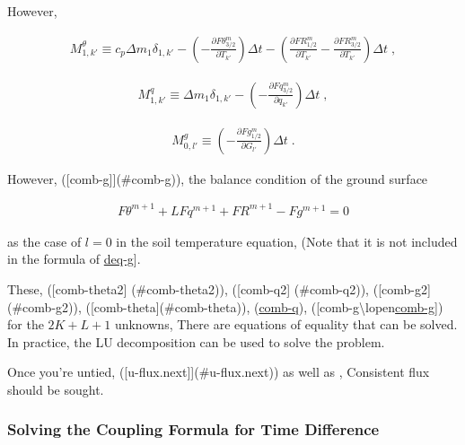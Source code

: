 \begin{quote}
\protect\hypertarget{combo-g}{}{\cleaner[combo-g]}
\end{quote}

However,

\begin{eqnarray}
M^{\theta}_{1,k'} \equiv c_p \Delta m_1 \delta_{1,k'}
          -  \left(
                   - \frac{\partial F\theta^{m}_{3/2}}{\partial T_{k'}} \right) \Delta t
          -  \left( \frac{\partial FR^{m}_{1/2}}{\partial T_{k'}} 
                   - \frac{\partial FR^{m}_{3/2}}{\partial T_{k'}} \right) \Delta t \; , 
\end{eqnarray}

\begin{eqnarray}
M^{q}_{1,k'} \equiv \Delta m_1 \delta_{1,k'}
          -  \left(
                   - \frac{\partial Fq^{m}_{3/2}}{\partial q_{k'}} \right) \Delta t \; ,
\end{eqnarray}

\begin{eqnarray}
M^{g}_{0,l'} \equiv
             \left(
                   - \frac{\partial Fg^{m}_{1/2}}{\partial G_{l'}} \right) \Delta t \; .
\end{eqnarray}

However, ({[}comb-g{]}{]}(\#comb-g)), the balance condition of the
ground surface

\begin{eqnarray}
   F\theta^{m+1} + L Fq^{m+1} + FR^{m+1} - Fg^{m+1} = 0
\end{eqnarray}

as the case of \(l=0\) in the soil temperature equation, (Note that it
is not included in the formula of \protect\hyperlink{deq-g}{deq-g}{]}.

These, ({[}comb-theta2{]} (\#comb-theta2)), ({[}comb-q2{]} (\#comb-q2)),
({[}comb-g2{]} (\#comb-g2)), ({[}comb-theta{]}(\#comb-theta)),
(\protect\hyperlink{comb-q}{comb-q}),
({[}comb-g\textbackslash lopen\protect\hyperlink{comb-g}{comb-g{]}}) for
the \(2K+L+1\) unknowns, There are equations of equality that can be
solved. In practice, the LU decomposition can be used to solve the
problem.

Once you're untied, ({[}u-flux.next{]}{]}(\#u-flux.next)) as well as ,
Consistent flux should be sought.

\hypertarget{solving-the-coupling-formula-for-time-difference}{%
\subsubsection{Solving the Coupling Formula for Time
Difference}\label{solving-the-coupling-formula-for-time-difference}}

